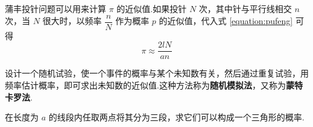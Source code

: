 \begin{solution}
\begin{figure}[H]
\begin{minipage}[b]{0.48\linewidth}
            \caption{}
            \label{fig:pufeng:1}
        \end{minipage}
        \hfill
        \begin{minipage}[b]{0.48\linewidth}
            \centering
    
            
            \caption{}
            \label{fig:pufeng:2}
        \end{minipage}
    \end{figure}
\end{solution}

\begin{note}
    \indent 蒲丰投针问题可以用来计算 $\pi$ 的近似值.如果投针 $N$ 次，其中针与平行线相交 $n$ 次，当 $N$ 很大时，以频率 $\dfrac{n}{N}$ 作为概率 $p$ 的近似值，代入式 \eqref{equation:pufeng} 可得
    $$
    \pi \approx \dfrac{2lN}{an}
    $$
\end{note}

设计一个随机试验，使一个事件的概率与某个未知数有关，然后通过重复试验，用频率估计概率，即可求出未知数的近似值.这种方法称为\textbf{随机模拟法}，又称为\textbf{蒙特卡罗法}.

\begin{example}
    \indent 在长度为 $a$ 的线段内任取两点将其分为三段，求它们可以构成一个三角形的概率.
\end{example}


